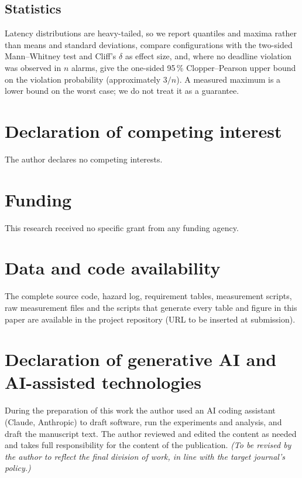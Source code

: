 \documentclass[preprint,3p,10pt]{elsarticle}
\begin{document}
\subsection{Statistics}
Latency distributions are heavy-tailed, so we report quantiles and maxima rather than means and standard deviations, compare configurations with the two-sided Mann--Whitney test and Cliff's $\delta$ as effect size, and, where no deadline violation was observed in $n$ alarms, give the one-sided 95\,\% Clopper--Pearson upper bound on the violation probability (approximately $3/n$). A measured maximum is a lower bound on the worst case; we do not treat it as a guarantee.



\section*{Declaration of competing interest}
The author declares no competing interests.

\section*{Funding}
This research received no specific grant from any funding agency.

\section*{Data and code availability}
The complete source code, hazard log, requirement tables, measurement scripts, raw measurement files and the scripts that generate every table and figure in this paper are available in the project repository (URL to be inserted at submission).

\section*{Declaration of generative AI and AI-assisted technologies}
During the preparation of this work the author used an AI coding assistant (Claude, Anthropic) to draft software, run the experiments and analysis, and draft the manuscript text. The author reviewed and edited the content as needed and takes full responsibility for the content of the publication. \emph{(To be revised by the author to reflect the final division of work, in line with the target journal's policy.)}



\end{document}

